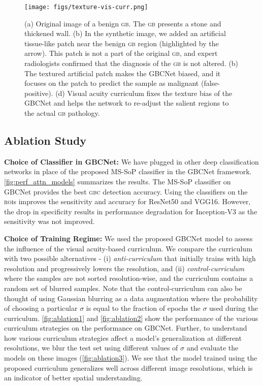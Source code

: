 \documentclass[10pt,twocolumn,letterpaper]{article}
\def\gbc{\textsc{gbc}\xspace}
\def\gb{\textsc{gb}\xspace}
\def\rois{\textsc{roi}s\xspace}
\newcommand{\myfirstpara}[1]{\noindent \textbf{#1:}}
\newcommand{\mypara}[1]{\vspace{0.1em} \myfirstpara{#1}}
\begin{document}
\begin{figure}[t]
	\centering
	\texttt{[image: figs/texture-vis-curr.png]}
	\caption{(a) Original image of a benign \gb. The \gb presents a stone and thickened wall. (b) In the synthetic image, we added an artificial tissue-like patch near the benign \gb region (highlighted by the arrow). This patch is not a part of the original \gb, and expert radiologists confirmed that the diagnosis of the \gb is not altered. (b) The textured artificial patch makes the GBCNet biased, and it focuses on the patch to predict the sample as malignant (false-positive). (d) Visual acuity curriculum fixes the texture bias of the GBCNet and helps the network to re-adjust the salient regions to the actual \gb pathology. }
	\label{fig:texture_vis}
\end{figure}



\subsection{Ablation Study}
\myfirstpara{Choice of Classifier in GBCNet}
We have plugged in other deep classification networks in place of the proposed MS-SoP classifier in the GBCNet framework. \cref{fig:perf_attn_models} summarizes the results. The MS-SoP classifier on GBCNet provides the best \gbc detection accuracy. Using the classifiers on the \rois improves the sensitivity and accuracy for ResNet50 and VGG16. However, the drop in specificity results in performance degradation for Inception-V3 as the sensitivity was not improved.  

\mypara{Choice of Training Regime}
We used the proposed GBCNet model to assess the influence of the visual acuity-based curriculum. We compare the curriculum with two possible alternatives - (i) \emph{anti-curriculum} that initially trains with high resolution and progressively lowers the resolution, and (ii) \emph{control-curriculum} where the samples are not sorted resolution-wise, and the curriculum contains a random set of blurred samples. Note that the control-curriculum can also be thought of using Gaussian blurring as a data augmentation where the probability of choosing a particular $\sigma$ is equal to the fraction of epochs the $\sigma$ used during the curriculum. \cref{fig:ablation1} and \ref{fig:ablation2} show the performance of the various curriculum strategies on the performance on GBCNet.  Further, to understand how various curriculum strategies affect a model's generalization at different resolutions, we blur the test set using different values of $\sigma$ and evaluate the models on these images (\cref{fig:ablation3}). 
We see that the model trained using the proposed curriculum generalizes well across different image resolutions, which is an indicator of better spatial understanding.
\end{document}
